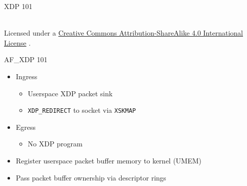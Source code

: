 \documentclass[aspectratio=169, xcolor=table]{beamer}
\begin{document}
  \begin{frame}{XDP 101}
  \begin{center}
  \\
    \vfill
  {\fontsize{3pt}{3pt}\selectfont Licensed under a \href{http://creativecommons.org/licenses/by-sa/4.0/}{Creative Commons Attribution-ShareAlike 4.0 International License} \ccbysa.}
  \end{center}
  \end{frame}

  \begin{frame}{AF\_XDP 101}
    \begin{itemize}
    \item Ingress
      \begin{itemize}
      \item Userspace XDP packet sink
      \item {\tt XDP\_REDIRECT} to socket via {\tt XSKMAP}
      \end{itemize}
    \item Egress
      \begin{itemize}
      \item No XDP program
      \end{itemize}
    \item Register userspace packet buffer memory to kernel (UMEM)
    \item Pass packet buffer ownership via descriptor rings
    \end{itemize}
  \end{frame}
\end{document}
